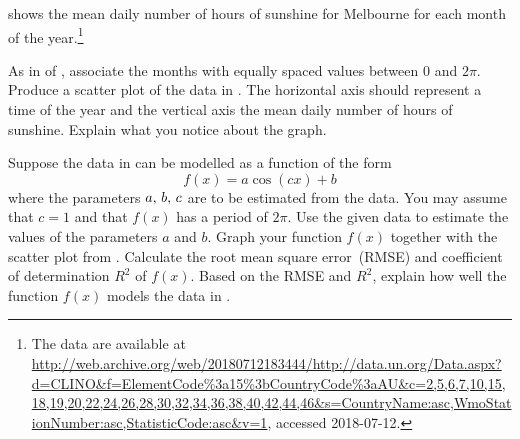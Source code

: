 \documentclass[a4paper,oneside,12pt]{article}
\begin{document}
\begin{problem}
{\begin{solution}
\end{solution}
}{}

\begin{table}[!htbp]
\centering

\caption{%
  The mean daily number of hours of sunshine for the city of
  Melbourne, Victoria, Australia.  The mean for each month was
  calculated using data for the years from $1961$ to $1990$.  The mean
  values are provided by the United Nations.
}
\label{tab:trigonometric:mean_daily_sunshine}
\end{table}

\item {} shows the mean
  daily number of hours of sunshine for Melbourne for each month of
  the year.\footnote{
    The data are available at
    \url{http://web.archive.org/web/20180712183444/http://data.un.org/Data.aspx?d=CLINO\&f=ElementCode\%3a15\%3bCountryCode\%3aAU\&c=2,5,6,7,10,15,18,19,20,22,24,26,28,30,32,34,36,38,40,42,44,46\&s=CountryName:asc,WmoStationNumber:asc,StatisticCode:asc\&v=1},
    accessed 2018-07-12.
  }
  \begin{packedenum}
  \item\label{subprob:trigonometric:mean_daily_sunshine_graph}
    As in  of
    , associate the
    months with equally spaced values between $0$ and $2\pi$.  Produce
    a scatter plot of the data in
    .  The horizontal
    axis should represent a time of the year and the vertical axis the
    mean daily number of hours of sunshine.  Explain what you notice
    about the graph.

  \item\label{subprob:trigonometric:mean_daily_sunshine_model}
    Suppose the data in 
    can be modelled as a function of the form
    \begin{equation}
    \label{eqn:trigonometric:mean_daily_sunshine_c1}
    f(x)
    =
    a \cos(cx) + b
    \end{equation}
    where the parameters ${a},\, {b},\, {c}$ are to be estimated from
    the data.  You may assume that $c = 1$ and that $f(x)$ has a
    period of $2\pi$.  Use the given data to estimate the values of
    the parameters $a$ and $b$.  Graph your function $f(x)$ together
    with the scatter plot
    from .
    Calculate the root mean square error~(RMSE) and coefficient of
    determination $R^2$ of $f(x)$.  Based on the RMSE and $R^2$,
    explain how well the function $f(x)$ models the data in
    .


\end{packedenum}
\end{problem}
\end{document}
